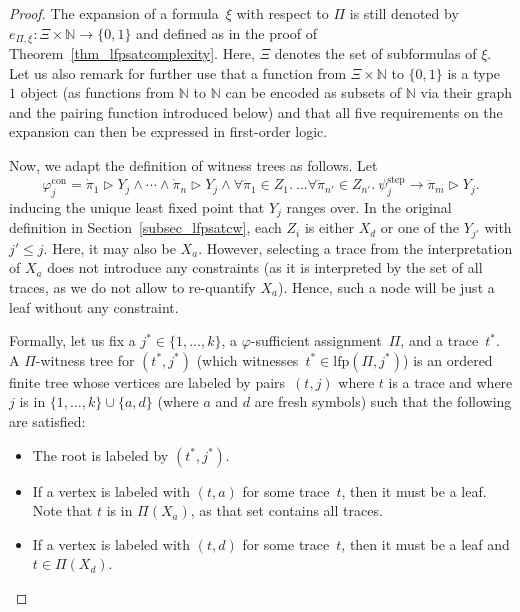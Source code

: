 \documentclass[dvipsnames,10pt,a4paper]{amsart}
\theoremstyle{definition}
\theoremstyle{remark}
\newcommand{\nats}{\mathbb{N}}
\renewcommand{\phi}{\varphi}
\newcommand{\set}[1]{\{#1\}}
\newcommand{\univar}{X_a}
\newcommand{\unidisvar}{X_d}
\newcommand{\con}{\mathrm{con}}
\newcommand{\step}{\mathrm{step}}
\newcommand{\tracein}{\mathrel{\triangleright}}
\newcommand{\overdot}[1]{\dot{#1}}
\newcommand{\overdotdot}[1]{\ddot{#1}}
\newcommand{\lfp}{\mathrm{lfp}}
\begin{document}
\begin{proof}
The expansion of a formula~$\xi$ with respect to $\Pi$ is  still denoted by $e_{\Pi,\xi}\colon \Xi\times\nats \rightarrow \set{0,1}$ and defined as in the proof of Theorem~\ref{thm_lfpsatcomplexity}.
Here, $\Xi$ denotes the set of subformulas of $\xi$.
Let us also remark for further use that a function from $\Xi\times\nats $ to $\set{0,1}$ is a type~$1$ object (as functions from $\nats$ to $\nats$ can be encoded as subsets of $\nats$ via their graph and the pairing function introduced below) and that all five requirements on the expansion can then be expressed in first-order logic.

Now, we adapt the definition of witness trees as follows.
Let
\begin{equation}
\label{eq_phiconscnd}
\phi_j^\con = \overdot{\pi}_1\tracein Y_j \wedge \cdots \wedge \overdot{\pi}_n \tracein Y_j \wedge   \forall \overdotdot{\pi}_1 \in Z_1.\ \ldots \forall \overdotdot{\pi}_{n'} \in Z_{n'}.\ \psi^\step_j \rightarrow \overdotdot{\pi}_m \tracein Y_j.    
\end{equation}
inducing the unique least fixed point that $Y_j$ ranges over. 
In the original definition in Section~\ref{subsec_lfpsatcw}, each $Z_i$ is either $\unidisvar$ or one of the $Y_{j'}$ with $j' \le j$.
Here, it may also be $\univar$.
However, selecting a trace from the interpretation of $\univar$ does not introduce any constraints (as it is interpreted by the set of all traces, as we do not allow to re-quantify $\univar$).
Hence, such a node will be just a leaf without any constraint. 

Formally, let us fix a $j^* \in \set{1,\ldots,k}$, a $\phi$-sufficient assignment~$\Pi$, and a trace~$t^*$. 
A $\Pi$-witness tree for $(t^*,j^*)$ (which witnesses~$t^* \in\lfp(\Pi,j^*)$) is an ordered finite tree whose vertices are labeled by pairs~$(t,j)$ where $t$ is a trace and where $j $ is in $\set{1,\ldots, k} \cup \set{a,d}$ (where $a$ and $d$ are fresh symbols) such that the following are satisfied:
\begin{itemize}
    \item The root is labeled by $(t^*, j^*)$.
    
    \item If a vertex is labeled with $(t,a)$ for some trace~$t$, then it must be a leaf. Note that $t$ is in $\Pi(\univar)$, as that set contains all traces.
    
    \item If a vertex is labeled with $(t,d)$ for some trace~$t$, then it must be a leaf and $t \in \Pi(\unidisvar)$.
    

\end{itemize}
\end{proof}
\end{document}
